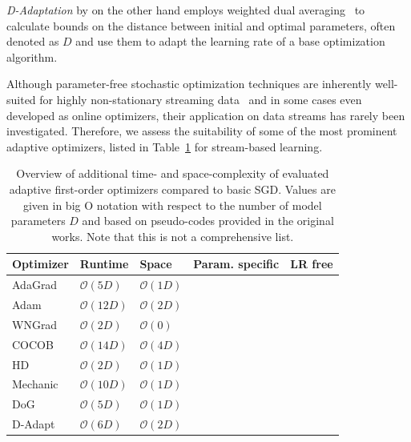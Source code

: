 \documentclass[runningheads]{llncs}
\newcommand{\cmark}{\ding{51}} %
\newcommand{\xmark}{\ding{55}} %
\begin{document}
\textit{D-Adaptation} by \textcite{defazioLearningRateFreeLearningDAdaptation2023a} on the other hand employs weighted dual averaging~\cite{duchiDualAveragingDistributed2012} to calculate bounds on the distance between initial and optimal parameters, often denoted as $D$ and use them to adapt the learning rate of a base optimization algorithm.

Although parameter-free stochastic optimization techniques are inherently well-suited for highly non-stationary streaming data~\cite{schaulNoMorePesky2013} and in some cases even developed as online optimizers, their application on data streams has rarely been investigated.
Therefore, we assess the suitability of some of the most prominent adaptive optimizers, listed in Table~\ref{tab:param_free_optims} for stream-based learning.

\begin{table}[ht]
	\centering
	\small
	\begin{tabular}{@{}lllcc@{}}
		\toprule
		Optimizer                & Runtime            & Space             & Param. specific & LR free \\ \midrule
		AdaGrad                  & $\mathcal{O}(5D)$  & $\mathcal{O}(1D)$ & \cmark          & \xmark  \\
		Adam                     & $\mathcal{O}(12D)$ & $\mathcal{O}(2D)$ & \cmark          & \xmark  \\
		WNGrad                   & $\mathcal{O}(2D)$  & $\mathcal{O}(0)$  & \xmark          & \xmark  \\
		COCOB                    & $\mathcal{O}(14D)$ & $\mathcal{O}(4D)$ & \cmark          & \cmark  \\
		HD \footnotemark[1]      & $\mathcal{O}(2D)$  & $\mathcal{O}(1D)$ & \xmark          & \xmark  \\
		Mechanic                 & $\mathcal{O}(10D)$ & $\mathcal{O}(1D)$ & \cmark          & \cmark  \\
		DoG \footnotemark[1]     & $\mathcal{O}(5D)$  & $\mathcal{O}(1D)$ & \xmark          & \cmark  \\
		D-Adapt \footnotemark[1] & $\mathcal{O}(6D)$  & $\mathcal{O}(2D)$ & \xmark          & \cmark  \\
		\bottomrule
	\end{tabular}
	\caption{Overview of additional time- and space-complexity of evaluated adaptive first-order optimizers compared to basic SGD. Values are given in big O notation with respect to the number of model parameters $D$ and based on pseudo-codes provided in the original works. Note that this is not a comprehensive list.}\label{tab:param_free_optims}
\end{table}
\end{document}
